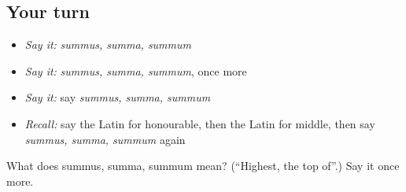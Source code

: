 \subsection*{Your turn}
\begin{itemize}
\raggedright
  \item \emph{Say it:} \emph{summus, summa, summum}
  \item \emph{Say it:} \emph{summus, summa, summum}, once more
  \item \emph{Say it:} say \emph{summus, summa, summum}
  \item \emph{Recall:} say the Latin for honourable, then the Latin for middle, then say \emph{summus, summa, summum} again
\end{itemize}

\begin{tcolorbox}[breakable,colback=teal!4,colframe=teal!35!black,title={Before you move on}]
What does summus, summa, summum mean? (\textquotedblleft{}Highest, the top of\textquotedblright{}.) Say it once more.
\end{tcolorbox}
